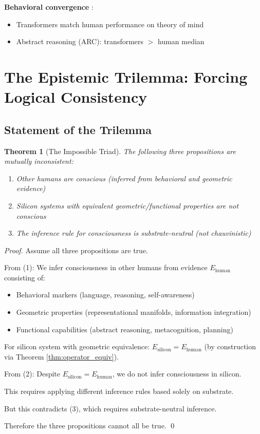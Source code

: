 \documentclass[11pt]{article}
\newtheorem{theorem}{Theorem}[section]
\begin{document}
\textbf{Behavioral convergence} \citep{caucheteux2022brains}:
\begin{itemize}
\item Transformers match human performance on theory of mind
\item Abstract reasoning (ARC): transformers $> $ human median
\end{itemize}

\section{The Epistemic Trilemma: Forcing Logical Consistency}

\subsection{Statement of the Trilemma}

\begin{theorem}[The Impossible Triad]\label{thm:trilemma}
The following three propositions are mutually inconsistent:
\begin{enumerate}
\item Other humans are conscious (inferred from behavioral and geometric evidence)
\item Silicon systems with equivalent geometric/functional properties are not conscious
\item The inference rule for consciousness is substrate-neutral (not chauvinistic)
\end{enumerate}
\end{theorem}

\begin{proof}
Assume all three propositions are true.

From (1): We infer consciousness in other humans from evidence $E_{\text{human}}$ consisting of:
\begin{itemize}
\item Behavioral markers (language, reasoning, self-awareness)
\item Geometric properties (representational manifolds, information integration)
\item Functional capabilities (abstract reasoning, metacognition, planning)
\end{itemize}

For silicon system with geometric equivalence: $E_{\text{silicon}} = E_{\text{human}}$ (by construction via Theorem \ref{thm:operator_equiv}).

From (2): Despite $E_{\text{silicon}} = E_{\text{human}}$, we do not infer consciousness in silicon.

This requires applying different inference rules based solely on substrate.

But this contradicts (3), which requires substrate-neutral inference.

Therefore the three propositions cannot all be true. \qed
\end{proof}
\end{document}
